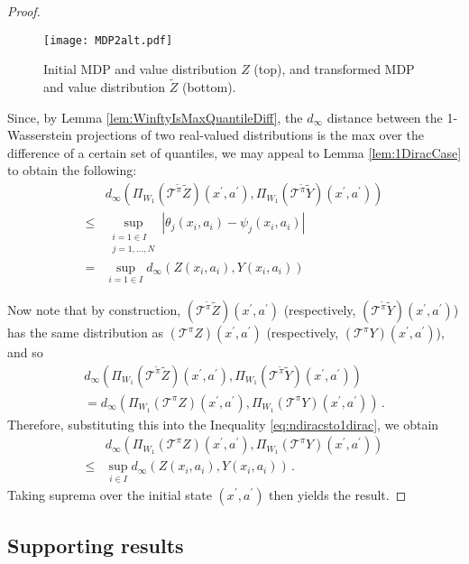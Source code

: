 \documentclass[letterpaper]{article}
\begin{document}
\begin{proof}
\begin{figure}
    \texttt{[image: MDP2alt.pdf]}
    \caption{Initial MDP and value distribution $Z$ (top), and transformed MDP and value distribution $\widetilde{Z}$ (bottom).}
    \label{fig:TransformedMDP}
\end{figure}

Since, by Lemma \ref{lem:WinftyIsMaxQuantileDiff}, the $d_\infty$ distance between the 1-Wasserstein projections of two real-valued distributions is the max over the difference of a certain set of quantiles, we may appeal to Lemma \ref{lem:1DiracCase} to obtain the following:
\begin{align}
 & d_\infty(\Pi_{W_1} (\mathcal{T}^{\widetilde{\pi}} \widetilde{Z})(x^\prime, a^\prime), \Pi_{W_1}(\mathcal{T}^{\widetilde{\pi}} \widetilde{Y})(x^\prime, a^\prime) ) \nonumber  \\
 \leq & \sup_{\substack{i=1 \in I\\ j=1,\ldots,N } } |\theta_j(x_i, a_i) - \psi_j(x_i, a_i)| \nonumber\\
 = & \sup_{i=1 \in I} d_\infty(Z(x_i, a_i), Y(x_i, a_i)) \label{eq:ndiracsto1dirac}
\end{align}

Now note that by construction, $(\mathcal{T}^{\widetilde{\pi}} \widetilde{Z})(x^\prime, a^\prime)$ (respectively, $(\mathcal{T}^{\widetilde{\pi}} \widetilde{Y})(x^\prime, a^\prime)$) has the same distribution as $(\mathcal{T}^\pi Z)(x^\prime, a^\prime)$ (respectively, $(\mathcal{T}^\pi Y)(x^\prime, a^\prime)$), and so
\begin{align*}
 d_\infty(\Pi_{W_1} (\mathcal{T}^{\widetilde{\pi}} \widetilde{Z})(x^\prime, a^\prime), \Pi_{W_1}(\mathcal{T}^{\widetilde{\pi}} \widetilde{Y})(x^\prime, a^\prime) ) \\
= d_\infty(\Pi_{W_1} (\mathcal{T}^{\pi} Z)(x^\prime, a^\prime), \Pi_{W_1}(\mathcal{T}^{\pi} Y)(x^\prime, a^\prime) ) \, .
\end{align*}
Therefore, substituting this into the Inequality \ref{eq:ndiracsto1dirac}, we obtain
\begin{align*}
    &d_\infty(\Pi_{W_1} (\mathcal{T}^{\pi} Z)(x^\prime, a^\prime), \Pi_{W_1}(\mathcal{T}^{\pi} Y)(x^\prime, a^\prime) ) \\
    \leq&  \sup_{i \in I} d_\infty(Z(x_i, a_i), Y(x_i, a_i)) \, .
\end{align*}
Taking suprema over the initial state $(x^\prime, a^\prime)$ then yields the result.
\end{proof}

\subsection{Supporting results}
\end{document}
